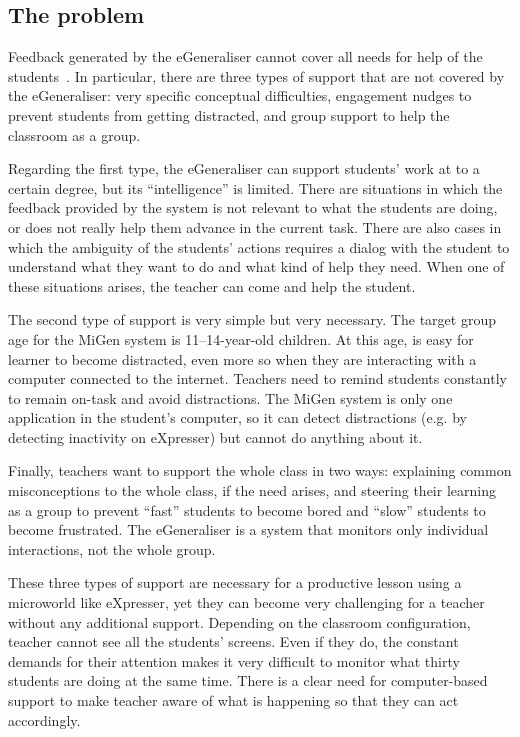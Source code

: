 \subsection{The problem}
\label{sec:problem}

Feedback generated by the eGeneraliser cannot cover all needs for help
of the students~\cite{ISmetrics}. In particular, there are three types
of support that are not covered by the eGeneraliser: very specific
conceptual difficulties, engagement nudges to prevent students from
getting distracted, and group support to help the classroom as a
group. 

Regarding the first type, the eGeneraliser can support students' work
at to a certain degree, but its ``intelligence'' is limited. There are
situations in which the feedback provided by the system is not
relevant to what the students are doing, or does not really help them
advance in the current task. There are also cases in which the
ambiguity of the students' actions requires a dialog with the student
to understand what they want to do and what kind of help they
need. When one of these situations arises, the teacher can come and
help the student. 

The second type of support is very simple but very necessary. The
target group age for the MiGen system is 11--14-year-old children. At
this age, is easy for learner to become distracted, even more so when
they are interacting with a computer connected to the
internet. Teachers need to remind students constantly to remain
on-task and avoid distractions. The MiGen system is only one
application in the student's computer, so it can detect distractions
(e.g. by detecting inactivity on eXpresser) but cannot do anything
about it. 

Finally, teachers want to support the whole class in two ways:
explaining common misconceptions to the whole class, if the need
arises, and steering their learning as a group to prevent ``fast''
students to become bored and ``slow'' students to become
frustrated. The eGeneraliser is a system that monitors only
individual interactions, not the whole group. 

These three types of support are necessary for a productive lesson
using a microworld like eXpresser, yet they can become very
challenging for a teacher without any additional support. Depending on
the classroom configuration, teacher cannot see all the students'
screens. Even if they do, the constant demands for their attention
makes it very difficult to monitor what thirty students are doing at
the same time. There is a clear need for computer-based support to
make teacher aware of what is happening so that they can act
accordingly. 

